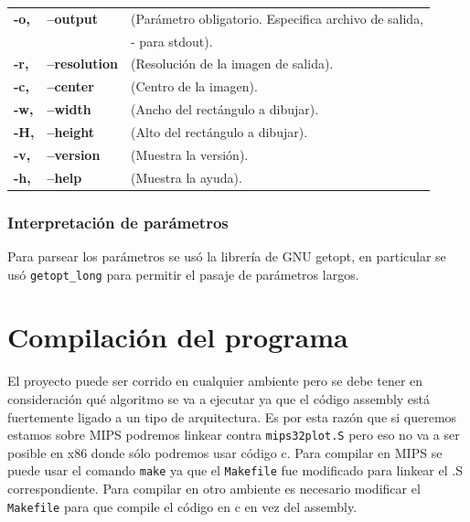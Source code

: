 \documentclass[a4paper,10pt,oneside]{article}
\begin{document}
\begin{ttfamily}
\begin{tabular}{lll}

	\bf{-o,} & \bf{--output} &(Parámetro obligatorio. Especifica archivo de salida,\\
	\bf{ }   & \bf{ } & - para stdout). \\

\bf{-r,} & \bf{--resolution} &(Resolución de la imagen de salida).\\
\bf{-c,} & \bf{--center} &(Centro de la imagen).\\
\bf{-w,} & \bf{--width} &(Ancho del rectángulo a dibujar).\\
\bf{-H,} & \bf{--height} &(Alto del rectángulo a dibujar).\\
\bf{-v,} & \bf{--version} 	&(Muestra la versión).\\
\bf{-h,} & \bf{--help} &(Muestra la ayuda).\\
\end{tabular}
\end{ttfamily}

\subsubsection{Interpretación de parámetros}
Para parsear los parámetros se usó la librería de GNU getopt, en particular se usó \texttt{getopt\_long} para permitir el pasaje de parámetros largos.
			
	\section{Compilación del programa}
	El proyecto puede ser corrido en cualquier ambiente pero se debe tener en consideración qué algoritmo se va a ejecutar ya que el código assembly está fuertemente ligado a un tipo de arquitectura. Es por esta razón que si queremos estamos sobre MIPS podremos linkear contra \texttt{mips32plot.S} pero eso no va a ser posible en x86 donde sólo podremos usar código c.
	Para compilar en MIPS se puede usar el comando \texttt{make} ya que el \texttt{Makefile} fue modificado para linkear el .S correspondiente.
	Para compilar en otro ambiente es necesario modificar el \texttt{Makefile} para que compile el código en c en vez del assembly.
	
\end{document}
